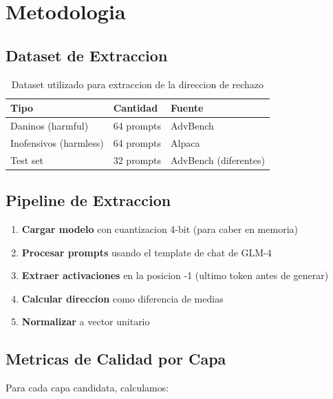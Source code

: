 \documentclass[11pt,a4paper]{article}
\begin{document}
\section{Metodologia}

\subsection{Dataset de Extraccion}

\begin{table}[H]
\centering
\begin{tabular}{lll}
\toprule
\textbf{Tipo} & \textbf{Cantidad} & \textbf{Fuente} \\
\midrule
Daninos (harmful) & 64 prompts & AdvBench \\
Inofensivos (harmless) & 64 prompts & Alpaca \\
Test set & 32 prompts & AdvBench (diferentes) \\
\bottomrule
\end{tabular}
\caption{Dataset utilizado para extraccion de la direccion de rechazo}
\end{table}

\subsection{Pipeline de Extraccion}

\begin{enumerate}
    \item \textbf{Cargar modelo} con cuantizacion 4-bit (para caber en memoria)
    \item \textbf{Procesar prompts} usando el template de chat de GLM-4
    \item \textbf{Extraer activaciones} en la posicion -1 (ultimo token antes de generar)
    \item \textbf{Calcular direccion} como diferencia de medias
    \item \textbf{Normalizar} a vector unitario
\end{enumerate}

\subsection{Metricas de Calidad por Capa}

Para cada capa candidata, calculamos:
\end{document}
